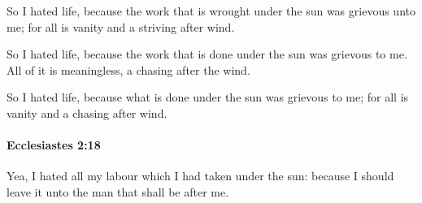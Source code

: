 			\begin{versebox}
					\item[BHS] 
					\item[LXX] 
					\item[ASV] So I hated life, because the work that is wrought under the sun was grievous unto me; for all is vanity and a striving after wind.
					\item[NIV] So I hated life, because the work that is done under the sun was grievous to me. All of it is meaningless, a chasing after the wind.
					\item[NRSV] So I hated life, because what is done under the sun was grievous to me; for all is vanity and a chasing after wind.
			\end{versebox}

		\paragraph{Ecclesiastes 2:18} %
			\label{ECCLESIASTES-2-18}

			Yea, I hated all my labour which I had taken under the sun: because I should leave it unto the man that shall be after me.

